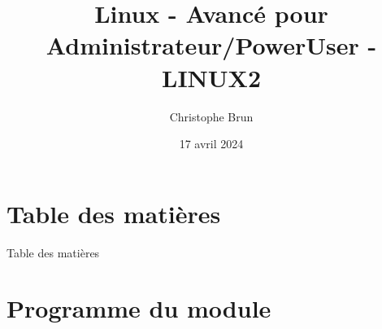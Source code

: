 \documentclass{beamer}
\title[LINUX2]{Linux - Avancé pour Administrateur/PowerUser - LINUX2}
\author{Christophe Brun}
\institute{Digicomp}
\date{17 avril 2024}
\begin{document}
    \begin{frame}
        \transdissolve
        \titlepage
    \end{frame}


    \section{Table des matières}\label{sec:toc}

    \begin{frame}{Table des matières}
        \tableofcontents
    \end{frame}


    \section{Programme du module}\label{sec:programme-du-module}
\end{document}
